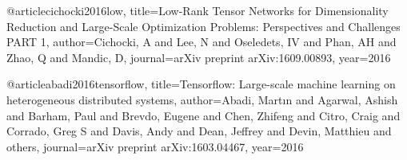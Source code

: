 @article{cichocki2016low,
  title={Low-Rank Tensor Networks for Dimensionality Reduction and Large-Scale Optimization Problems: Perspectives and Challenges PART 1},
  author={Cichocki, A and Lee, N and Oseledets, IV and Phan, AH and Zhao, Q and Mandic, D},
  journal={arXiv preprint arXiv:1609.00893},
  year={2016}
}

@article{abadi2016tensorflow,
  title={Tensorflow: Large-scale machine learning on heterogeneous distributed systems},
  author={Abadi, Mart{\i}n and Agarwal, Ashish and Barham, Paul and Brevdo, Eugene and Chen, Zhifeng and Citro, Craig and Corrado, Greg S and Davis, Andy and Dean, Jeffrey and Devin, Matthieu and others},
  journal={arXiv preprint arXiv:1603.04467},
  year={2016}
}










